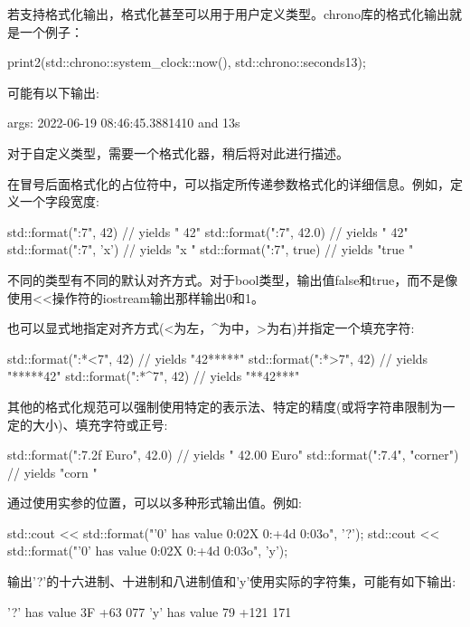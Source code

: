 若支持格式化输出，格式化甚至可以用于用户定义类型。chrono库的格式化输出就是一个例子：

\begin{cpp}
print2(std::chrono::system_clock::now(), std::chrono::seconds{13});
\end{cpp}

可能有以下输出:

\begin{shell}
args: 2022-06-19 08:46:45.3881410 and 13s
\end{shell}

对于自定义类型，需要一个格式化器，稍后将对此进行描述。

在冒号后面格式化的占位符中，可以指定所传递参数格式化的详细信息。例如，定义一个字段宽度:

\begin{cpp}
std::format("{:7}", 42) // yields " 42"
std::format("{:7}", 42.0) // yields " 42"
std::format("{:7}", 'x') // yields "x "
std::format("{:7}", true) // yields "true "
\end{cpp}

不同的类型有不同的默认对齐方式。对于bool类型，输出值false和true，而不是像使用<{}<操作符的iostream输出那样输出0和1。

也可以显式地指定对齐方式(<为左，\^{}为中，>为右)并指定一个填充字符:

\begin{cpp}
std::format("{:*<7}", 42) // yields "42*****"
std::format("{:*>7}", 42) // yields "*****42"
std::format("{:*^7}", 42) // yields "**42***"
\end{cpp}

其他的格式化规范可以强制使用特定的表示法、特定的精度(或将字符串限制为一定的大小)、填充字符或正号:

\begin{cpp}
std::format("{:7.2f} Euro", 42.0) // yields " 42.00 Euro"
std::format("{:7.4}", "corner") // yields "corn "
\end{cpp}

通过使用实参的位置，可以以多种形式输出值。例如:

\begin{cpp}
std::cout << std::format("'{0}' has value {0:02X} {0:+4d} {0:03o}\n", '?');
std::cout << std::format("'{0}' has value {0:02X} {0:+4d} {0:03o}\n", 'y');
\end{cpp}

输出'?'的十六进制、十进制和八进制值和'y'使用实际的字符集，可能有如下输出:

\begin{shell}
’?’ has value 3F +63 077
’y’ has value 79 +121 171
\end{shell}

